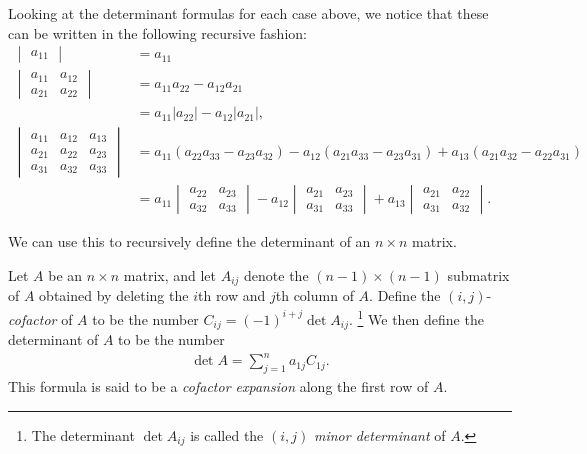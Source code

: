 \documentclass[12pt,letterpaper,reqno]{article}
\numberwithin{equation}{section}
\begin{document}
Looking at the determinant formulas for each case above, we notice that these can be written in the following recursive fashion:
\begin{align}
	\begin{vmatrix}
	a_{11}	
	\end{vmatrix} &=a_{11} \\
	\begin{vmatrix}
		a_{11} & a_{12} \\ a_{21} & a_{22}
	\end{vmatrix} &=a_{11}a_{22}-a_{12}a_{21} \label{eq:2_by_2_det} \\
	&=a_{11}|a_{22}|-a_{12}|a_{21}|, \\
	\begin{vmatrix}
		a_{11} & a_{12} & a_{13} \\ a_{21} & a_{22} & a_{23} \\ a_{31} & a_{32} & a_{33}
	\end{vmatrix}&=a_{11}(a_{22}a_{33}-a_{23}a_{32})-a_{12}(a_{21}a_{33}-a_{23}a_{31})+a_{13}(a_{21}a_{32}-a_{22}a_{31}) \\
	&=a_{11}\begin{vmatrix}
		a_{22} & a_{23} \\ a_{32} & a_{33}
	\end{vmatrix}-a_{12}\begin{vmatrix}
		a_{21} & a_{23} \\ a_{31} & a_{33}
	\end{vmatrix}+a_{13} \begin{vmatrix}
		a_{21} & a_{22} \\ a_{31} & a_{32}
	\end{vmatrix}.
\end{align}

We can use this to recursively define the determinant of an $n \times n$ matrix.

\begin{defn}
	Let $A$ be an $n \times n$ matrix, and let $A_{ij}$ denote the $(n-1) \times (n-1)$ submatrix of $A$ obtained by deleting the $i$th row and $j$th column of $A$. Define the $(i,j)$-\emph{cofactor} of $A$ to be the number $C_{ij}=(-1)^{i+j}\det A_{ij}$. \footnote{The determinant $\det A_{ij}$ is called the $(i,j)$ \emph{minor determinant} of $A$.} We then define the determinant of $A$ to be the number
	\begin{align}\label{eq:cof_along_first_row}
		\det A=\sum_{j=1}^n a_{1j}C_{1j}.
	\end{align}
	This formula is said to be a \emph{cofactor expansion} along the first row of $A$.
\end{defn}
\end{document}
